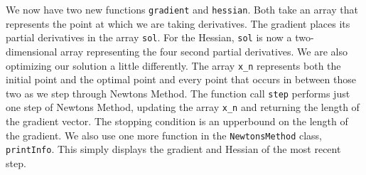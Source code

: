 \documentclass{amsart}
\theoremstyle{plain}
\numberwithin{equation}{section}
\begin{document}
\bigskip

We now have two new functions \verb|gradient| and \verb|hessian|. Both take an array that represents the point at which we are taking derivatives. The gradient places its partial derivatives in the array \verb|sol|. For the Hessian, \verb|sol| is now a two-dimensional array representing the four second partial derivatives. We are also optimizing our solution a little differently. The array \verb|x_n| represents both the initial point and the optimal point and every point that occurs in between those two as we step through Newtons Method. The function call \verb|step| performs just one step of Newtons Method, updating the array \verb|x_n| and returning the length of the gradient vector. The stopping condition is an upperbound on the length of the gradient. We also use one more function in the \verb|NewtonsMethod| class, \verb|printInfo|. This simply displays the gradient and Hessian of the most recent step.
\end{document}
